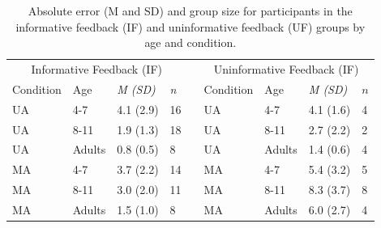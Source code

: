 \documentclass[a4paper,man,natbib,floatsintext,noextraspace]{apa6}
\begin{document}
\begin{table}
\caption{Absolute error (M and SD) and group size for participants in the informative feedback (IF) and uninformative feedback (UF) groups by age and condition.}
\label{tab:1}
\begin{tabular}{@{}lllllllll@{}}
\multicolumn{4}{c}{Informative Feedback (IF)}                                                                                   &                       & \multicolumn{4}{c}{Uninformative Feedback (IF)}                                                                  \\ 
\multicolumn{1}{l}{Condition} & \multicolumn{1}{l}{Age} & \multicolumn{1}{l}{\textit{M (SD)}} & \multicolumn{1}{l}{\textit{n}} & \multicolumn{1}{l}{} & \multicolumn{1}{l}{Condition} & \multicolumn{1}{l}{Age} & \multicolumn{1}{l}{\textit{M (SD)}} & \multicolumn{1}{l}{$n$} \\ \midrule
UA                              & 4-7                      & 4.1 (2.9)                            & 16                              &                       & UA                             & 4-7                      & 4.1 (1.6)                   & 4                      \\
UA                              & 8-11                     & 1.9 (1.3)                            & 18                              &                       & UA                             & 8-11                     & 2.7 (2.2)                   & 2                      \\
UA                              & Adults                   & 0.8 (0.5)                            & 8                               &                       & UA                             & Adults                   & 1.4 (0.6)                   & 4                      \\
MA                              & 4-7                      & 3.7 (2.2)                            & 14                              &                       & MA                             & 4-7                      & 5.4 (3.2)                   & 5                      \\
MA                              & 8-11                     & 3.0 (2.0)                            & 11                              &                       & MA                             & 8-11                     & 8.3 (3.7)                   & 8                      \\
MA                              & Adults                   & 1.5 (1.0)                            & 8                               &                       & MA                             & Adults                   & 6.0 (2.7)                   & 4                      \\ \bottomrule
\end{tabular}
\end{table}
\end{document}
